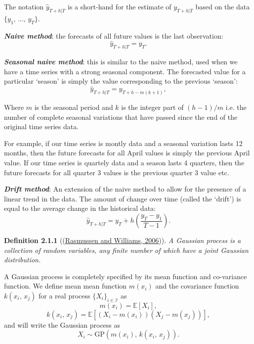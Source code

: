 \documentclass[a4paper, 10pt, fleqn]{article}
\begin{document}
\begin{flushleft}
      The notation $\hat{y}_{T+h|T}$ is a short-hand for the estimate of $y_{T+h|T}$ based on the data $\{y_{1},\, \ldots,\, y_{T}\}$.

      \vspace{1em}

      \textbf{\textit{Naive method}}: the forecasts of all future values is the last observation: $$\hat{y}_{T+h|T} = y_{T}.$$

      \textbf{\textit{Seasonal naive method}}: this is similar to the naive method, used when we have a time series with a strong seasonal component. The forecasted value for a particular `season' is simply the value corresponding to the previous `season': $$\hat{y}_{T+h|T} = y_{T+h-m(k+1)},$$

      Where $m$ is the seasonal period and $k$ is the integer part of $(h-1)/m$ i.e. the number of complete seasonal variations that have passed since the end of the original time series data.

      \vspace{1em}

      For example, if our time series is montly data and a seasonal variation lasts 12 months, then the future forecasts for all April values is simply the previous April value. If our time series is quartely data and a season lasts 4 quarters, then the future forecasts for all quarter 3 values is the previous quarter 3 value etc.

      \vspace{1em}

      \textbf{\textit{Drift method}}: An extension of the naive method to allow for the presence of a linear trend in the data. The amount of change over time (called the `drift') is equal to the average change in the historical data: $$\hat{y}_{T+h|T} = y_{T} + h(\frac{y_{T} - y_{1}}{T-1}).$$

   \vspace{1em}

   \textbf{Definition 2.1.1} ((\hyperref[Rasmussen2006]{Rasmussen and Williams, 2006})).
   \textit{A Gaussian process is a collection of random variables, any finite number of which have a joint Gaussian distribution.}

   \vspace{1em}

   A Gaussian process is completely specified by its mean function and co-variance function. We define mean mean function $m(x_{i})$ and the covariance function $k(x_{i},\, x_{j})$ for a real process $\{X_{i}\}_{i \in \mathcal{I}}$ as
   $$m(x_{i}) = \mathbb{E}[X_{i}],$$
   $$k(x_{i},\, x_{j}) = \mathbb{E}[(X_{i} - m(x_{i}))(X_{j} - m(x_{j}))],$$
   and will write the Gaussian process as
   $$X_{i} \sim \text{GP}(m(x_{i}), \, k(x_{i},\, x_{j})).$$


\end{flushleft}
\end{document}
